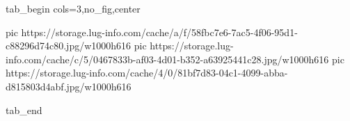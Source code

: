  
 
 
 
 


\ifcmt
  tab_begin cols=3,no_fig,center

     pic https://storage.lug-info.com/cache/a/f/58fbc7e6-7ac5-4f06-95d1-c88296d74c80.jpg/w1000h616%
     pic https://storage.lug-info.com/cache/c/5/0467833b-af03-4d01-b352-a63925441c28.jpg/w1000h616%
     pic https://storage.lug-info.com/cache/4/0/81bf7d83-04c1-4099-abba-d815803d4abf.jpg/w1000h616%

  tab_end
\fi
